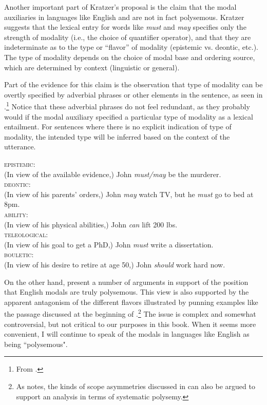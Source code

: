 Another important part of Kratzer’s proposal is the claim that the modal auxiliaries in languages like English and  are not in fact polysemous. Kratzer suggests that the lexical entry for words like \textit{must} and \textit{may} specifies only the strength of modality (i.e., the choice of quantifier operator), and that they are indeterminate as to the type or “flavor” of modality (epistemic vs. deontic, etc.). The type of modality depends on the choice of modal base and ordering source, which are determined by context (linguistic or general).



Part of the evidence for this claim is the observation that type of modality can be overtly specified by adverbial phrases or other elements in the sentence, as seen in .\footnote{From \citet{Hacquard2011}.} Notice that these adverbial phrases do not feel redundant, as they probably would if the modal auxiliary specified a particular type of modality as a lexical entailment. For sentences where there is no explicit indication of type of modality, the intended type will be inferred based on the context of the utterance.


\ea \label{ex:16.24}
\ea  \textsc{epistemic:}\\
(In view of the available evidence,) John \textit{must/may} be the murderer.\\
\ex \textsc{deontic:}\\
(In view of his parents’ orders,) John \textit{may} watch TV, but he \textit{must} go to bed at 8pm.\\
\ex \textsc{ability:}\\
(In view of his physical abilities,) John \textit{can} lift 200 lbs.\\
\ex \textsc{teleological:}\\
(In view of his goal to get a PhD,) John \textit{must} write a dissertation.\\
\ex \textsc{bouletic:}\\
(In view of his desire to retire at age 50,) John \textit{should} work hard now.
     \z
\z


On the other hand, \citet{Viebahn&Vetter2016} present a number of arguments in support of the position that English modals are truly polysemous. This view is also supported by the apparent antagonism of the different flavors illustrated by punning examples like the passage discussed at the beginning of .\footnote{As \citet{Hacquard2011} notes, the kinds of scope asymmetries discussed in  can also be argued to support an analysis in terms of systematic polysemy.} The issue is complex and somewhat controversial, but not critical to our purposes in this book. When it seems more convenient, I will continue to speak of the modals in languages like English as being ``polysemous".


